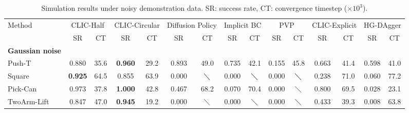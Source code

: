 \begin{table*}[t!]
\footnotesize
\caption{Simulation results under noisy demonstration data. SR: success rate, CT: convergence timestep ($\times 10^3$). }
\label{tab:sim_exp_noise}
\begin{center}
\begin{tabular}{lcccccccccc|cccc}
\Xhline{0.75pt}
Method & \multicolumn{2}{c}{CLIC-Half  } & \multicolumn{2}{c}{CLIC-Circular } & \multicolumn{2}{c}{Diffusion Policy} & \multicolumn{2}{c}{Implicit BC} & \multicolumn{2}{c}{PVP} & \multicolumn{2}{c}{CLIC-Explicit} & \multicolumn{2}{c}{HG-DAgger} \\
 & SR & CT & SR & CT & SR & CT & SR & CT &SR & CT & SR & CT & SR & CT \\
\hline
\textbf{Gaussian noise } && & & & & & & & & & && &\\ 
Push-T & 0.880 & 35.6 &  \textbf{0.960} & 29.2 & 0.893 & 49.0 & 0.735 & 42.1 & 0.155 & 45.8 & 0.663 & 41.4 & 0.598 & 41.0 \\
Square & \textbf{0.925} & 64.5 & 0.855 & 63.9 & 0.000 &  $\diagdown$ & 0.000 &  $\diagdown$ &   0.000 & $\diagdown$    & 0.238 & 71.0 & 0.060 & 77.2 \\
Pick-Can & 0.973 & 37.8 & \textbf{1.000} & 42.8 & 0.467 & 68.2 & 0.070 & 70.4 &   0.000 & $\diagdown$    & 0.800 & 69.5 & 0.028 & 23.1 \\
TwoArm-Lift & 0.847 & 47.0 & \textbf{0.945} &  19.2& 0.000 & $\diagdown$ &   0.000 & $\diagdown$    &  0.000 & $\diagdown$    & 0.433 & 39.3 & 0.008 & 63.8 \\
\hline

\end{tabular}
\end{center}
\end{table*}
